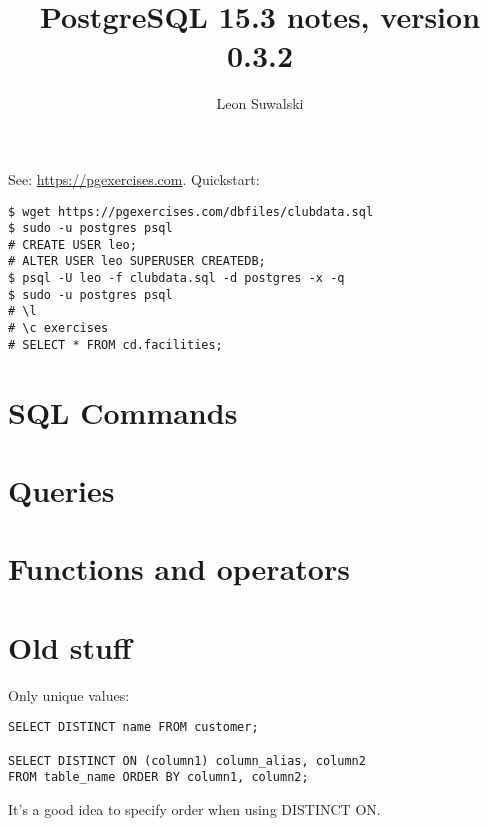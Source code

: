 \documentclass{charun}
\title{PostgreSQL 15.3 notes, version 0.3.2}
\author{Leon Suwalski}
\begin{document}
\begin{multicols*}{2}
\maketitle
\raggedright

See: \url{https://pgexercises.com}.
Quickstart:
\begin{verbatim}
$ wget https://pgexercises.com/dbfiles/clubdata.sql
$ sudo -u postgres psql
# CREATE USER leo;
# ALTER USER leo SUPERUSER CREATEDB;
$ psql -U leo -f clubdata.sql -d postgres -x -q
$ sudo -u postgres psql
# \l
# \c exercises
# SELECT * FROM cd.facilities;
\end{verbatim}

\section{SQL Commands}


\section{Queries}


\section{Functions and operators}








\newpage
\section{Old stuff}
Only unique values:
\begin{verbatim}
SELECT DISTINCT name FROM customer;

SELECT DISTINCT ON (column1) column_alias, column2
FROM table_name ORDER BY column1, column2;
\end{verbatim}

It's a good idea to specify order when using DISTINCT ON.


\end{multicols*}
\end{document}
